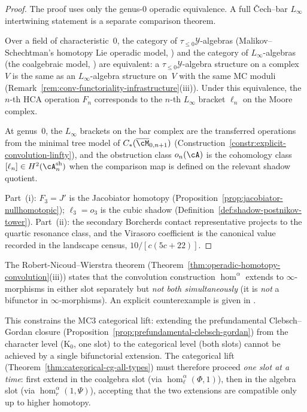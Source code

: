 \begin{proof}
The proof uses only the genus-$0$ operadic equivalence.  A full
\v{C}ech--bar $L_\infty$ intertwining statement is a separate
comparison theorem.

Over a field of characteristic~$0$, the category of
$\tau_{\leq 0}\mathcal{Y}$-algebras (Malikov--Schechtman's
homotopy Lie operadic model, \cite[\S2.6]{MS24}) and the category
of $L_\infty$-algebras (the coalgebraic model,
\cite[\S10.3]{LV12}) are equivalent: a
$\tau_{\leq 0}\mathcal{Y}$-algebra structure on a complex~$V$ is
the same as an $L_\infty$-algebra structure on~$V$ with the same
MC moduli (Remark~\ref{rem:conv-functoriality-infrastructure}(iii)).
Under this equivalence, the $n$-th HCA operation $F_n$ corresponds
to the $n$-th $L_\infty$ bracket $\ell_n$ on the Moore complex.

At genus~$0$, the $L_\infty$ brackets on the bar complex are the
transferred operations from the minimal tree model of
$C_*(\overline{\cM}_{0,n+1})$
(Construction~\ref{constr:explicit-convolution-linfty}), and the
obstruction class $o_n(\cA)$ is the cohomology class
$[\ell_n] \in H^2(\cA^{\mathrm{sh}}_n)$ when the comparison map is
defined on the relevant shadow quotient.

Part~(i): $F_3 = J'$ is the Jacobiator homotopy
(Proposition~\ref{prop:jacobiator-nullhomotopic}); $\ell_3 = o_3$
is the cubic shadow (Definition~\ref{def:shadow-postnikov-tower}).
Part~(ii): the secondary Borcherds contact representative projects
to the quartic resonance class, and the Virasoro coefficient is the
canonical value recorded in the landscape census,
$10/[c(5c+22)]$.
\end{proof}

\begin{remark}
\label{rem:one-slot-obstruction}%
%
%
The Robert-Nicoud--Wierstra theorem
(Theorem~\ref{thm:operadic-homotopy-convolution}(iii)) states that
the convolution construction $\operatorname{hom}^\alpha$ extends to
$\infty$-morphisms in either slot separately but \emph{not both simultaneously} (it is \emph{not} a bifunctor in $\infty$-morphisms).
An explicit counterexample is given in \cite[\S6]{RNW19}.

This constrains the MC3 categorical lift: extending the
prefundamental Clebsch--Gordan closure
(Proposition~\ref{prop:prefundamental-clebsch-gordan}) from the
character level (K$_0$, one slot) to the categorical level (both
slots) cannot be achieved by a single bifunctorial extension. The
categorical lift (Theorem~\ref{thm:categorical-cg-all-types}) must
therefore proceed
\emph{one slot at a time}: first extend in the coalgebra slot (via
$\operatorname{hom}^\alpha_\ell(\Phi,1)$), then in the algebra slot
(via $\operatorname{hom}^\alpha_r(1,\Psi)$), accepting that the
two extensions are compatible only up to higher homotopy.
\end{remark}

